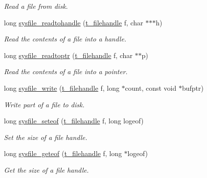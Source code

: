 \begin{DoxyCompactItemize}
\begin{DoxyCompactList}\small\item\em Read a file from disk. \item\end{DoxyCompactList}\item 
long \hyperlink{group__files_ga968931fc659e0b0fc13ac29fc1c151b5}{sysfile\_\-readtohandle} (\hyperlink{group__files_gafcb776aa74d514754e83b30995b5a5d1}{t\_\-filehandle} f, char $\ast$$\ast$$\ast$h)
\begin{DoxyCompactList}\small\item\em Read the contents of a file into a handle. \item\end{DoxyCompactList}\item 
long \hyperlink{group__files_gaccf3c95c4a25ea46a54bf082c649675e}{sysfile\_\-readtoptr} (\hyperlink{group__files_gafcb776aa74d514754e83b30995b5a5d1}{t\_\-filehandle} f, char $\ast$$\ast$p)
\begin{DoxyCompactList}\small\item\em Read the contents of a file into a pointer. \item\end{DoxyCompactList}\item 
long \hyperlink{group__files_ga8272d55e223bfd31e96db15f73be8805}{sysfile\_\-write} (\hyperlink{group__files_gafcb776aa74d514754e83b30995b5a5d1}{t\_\-filehandle} f, long $\ast$count, const void $\ast$bufptr)
\begin{DoxyCompactList}\small\item\em Write part of a file to disk. \item\end{DoxyCompactList}\item 
long \hyperlink{group__files_ga6f17a82aafd0afdf89612b8d4c123f6d}{sysfile\_\-seteof} (\hyperlink{group__files_gafcb776aa74d514754e83b30995b5a5d1}{t\_\-filehandle} f, long logeof)
\begin{DoxyCompactList}\small\item\em Set the size of a file handle. \item\end{DoxyCompactList}\item 
long \hyperlink{group__files_ga0523b180c53fc3e0b5766abc58dc6172}{sysfile\_\-geteof} (\hyperlink{group__files_gafcb776aa74d514754e83b30995b5a5d1}{t\_\-filehandle} f, long $\ast$logeof)
\begin{DoxyCompactList}\small\item\em Get the size of a file handle. \item\end{DoxyCompactList}\item 
$$
\end{DoxyCompactItemize}
